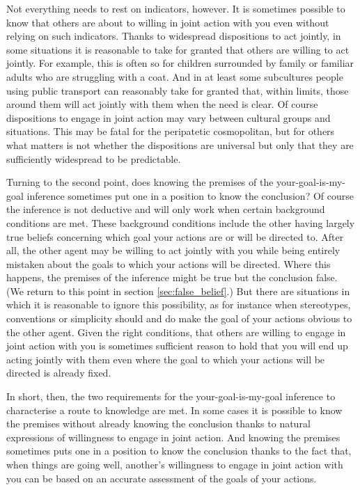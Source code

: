 \documentclass[14pt,a4paper]{extarticle}
\begin{document}
Not everything needs to rest on indicators, however.
It is sometimes possible to know that others are about to willing in joint action with you even without relying on such indicators.  
Thanks to widespread dispositions to act jointly, in some situations it is reasonable to take for granted that others are willing to act jointly.  
For example, this is often so for children surrounded by family or familiar adults who are struggling with a coat.  
And in at least some subcultures people using public transport can reasonably take for granted that, within limits, those around them will act jointly with them when the need is clear.
Of course dispositions to engage in joint action may vary between cultural groups and situations.
This may be fatal for the peripatetic cosmopolitan,
but for others what matters is not whether the dispositions are universal but only that they are sufficiently widespread to be predictable.

Turning to the second point,
does knowing the premises of the your-goal-is-my-goal inference sometimes put one in a position to know the conclusion?  
Of course the inference is not deductive and will only work when certain background conditions are met.  
These background conditions include the other having largely true beliefs concerning which goal your actions are or will be directed to.
After all, the other agent may be willing to act jointly with you while being entirely mistaken about the goals to which your actions will be directed.
Where this happens, the premises of the inference might be true but the conclusion false.
(We return to this point in section \vref{sec:false_belief}.)  
But there are situations in which it is reasonable  to ignore  this possibility, as for instance when stereotypes, conventions or simplicity should and do make the goal of your actions obvious to the other agent.
Given the right conditions,
that others are willing to engage in joint action with you 
is sometimes sufficient reason to hold that
you will end up acting jointly with them
 even where the goal to which your actions will be directed is already fixed.

In short, then, the two requirements for the your-goal-is-my-goal inference to characterise a route to knowledge are met.  
In some cases it is possible to know the premises without already knowing the conclusion thanks to natural expressions of willingness to engage in joint action.  
And knowing the premises sometimes puts one in a position to know the conclusion thanks to the fact that, when things are going well, another's willingness to engage in joint action with you can be based on an accurate assessment of the goals of your actions.
\end{document}
